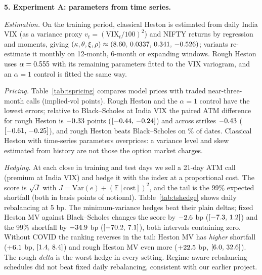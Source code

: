 \documentclass[10pt,leqno]{amsart}
\newcommand{\heading}[1]{\medskip\noindent\textbf{#1}\par}
\newcommand{\E}{\mathbb{E}}
\begin{document}
\begin{table}[ht]
\centering
\caption{The option sample of Experiment B.}\label{tab:data}

\end{table}

\heading{5. Experiment A: parameters from time series.}
\noindent \emph{Estimation.} On the training period, classical Heston is estimated from daily India VIX (as a variance proxy $v_t=(\mathrm{VIX}_t/100)^2$) and NIFTY returns by regression and moments, giving $(\kappa,\theta,\xi,\rho)\approx(8.60,\,0.0337,\,0.341,\,-0.526)$; variants re-estimate it monthly on 12-month, 6-month or expanding windows. Rough Heston uses $\alpha=0.555$ with its remaining parameters fitted to the VIX variogram, and an $\alpha=1$ control is fitted the same way.

\emph{Pricing.} Table~\ref{tab:tspricing} compares model prices with traded near-three-month calls (implied-vol points). Rough Heston and the $\alpha=1$ control have the lowest errors; relative to Black--Scholes at India VIX the paired ATM difference for rough Heston is $-0.33$ points ($[-0.44,\,-0.24]$) and across strikes $-0.43$ ($[-0.61,\,-0.25]$), and rough Heston beats Black--Scholes on \TSRoughWinPct\% of dates. Classical Heston with time-series parameters overprices: a variance level and skew estimated from history are not those the option market charges.

\begin{table}[ht]
\centering
\caption{Experiment A: pricing errors of traded near-three-month NIFTY calls, in implied-volatility points (shape RMSE removes each day's mean error).}\label{tab:tspricing}

\end{table}

\emph{Hedging.} At each close in \TSTrain{} training and \TSTest{} test days we sell a 21-day ATM call (premium at India VIX) and hedge it with the index at a proportional cost. The score is $\sqrt{J}$ with $J=\mathrm{Var}(e)+(\E[\text{cost}])^2$, and the tail is the 99\% expected shortfall (both in basis points of notional). Table~\ref{tab:tshedge} shows daily rebalancing at 5 bp. The minimum-variance hedges beat their plain deltas; fixed Heston MV against Black--Scholes changes the score by $-2.6$ bp ($[-7.3,\,1.2]$) and the 99\% shortfall by $-34.9$ bp ($[-70.2,\,7.1]$), both intervals containing zero. Without COVID the ranking reverses in the tail: Heston MV has \emph{higher} shortfall ($+6.1$ bp, $[1.4,\,8.4]$) and rough Heston MV even more ($+22.5$ bp, $[6.0,\,32.6]$). The rough \emph{delta} is the worst hedge in every setting. Regime-aware rebalancing schedules did not beat fixed daily rebalancing, consistent with our earlier project.
\end{document}
